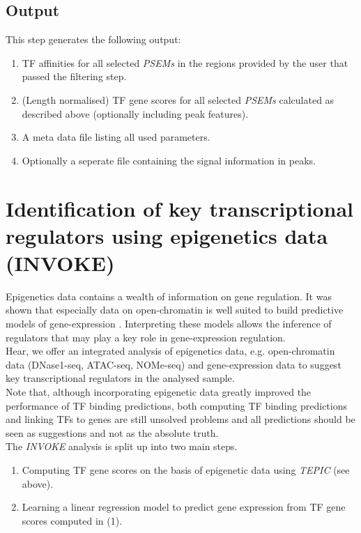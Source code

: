 \documentclass{article}
\begin{document}
\subsection*{Output}
This step generates the following output:
\begin{enumerate}
\item TF affinities for all selected \textit{PSEMs} in the regions provided by the user that passed the filtering step. 
\item (Length normalised) TF gene scores for all selected \textit{PSEMs} calculated as described above (optionally including peak features). 
\item A meta data file listing all used parameters.
\item Optionally a seperate file containing the signal information in peaks. 
\end{enumerate}

\section*{Identification of key transcriptional regulators using epigenetics data (INVOKE)}
Epigenetics data contains a wealth of information on gene regulation. It was shown that especially
data on open-chromatin is well suited to build predictive models of gene-expression \cite{pmid27899623,pmid22955983,pmid25231769,pmid22954627}.
Interpreting these models allows the inference of regulators that may play a key role in gene-expression regulation.
\bigskip
\\Hear, we offer an integrated analysis of epigenetics data, e.g. open-chromatin data (DNase1-seq, ATAC-seq, NOMe-seq) and gene-expression data
to suggest key transcriptional regulators in the analysed sample.
\bigskip
\\Note that, although incorporating epigenetic data greatly improved the performance of TF binding predictions, both computing TF binding predictions and linking TFs to genes are still unsolved problems and all predictions
should be seen as suggestions and not as the absolute truth.
\bigskip
\\The \textit{INVOKE} analysis is split up into two main steps. 
\begin{enumerate}
\item Computing TF gene scores on the basis of epigenetic data using \textit{TEPIC} (see above).
\item Learning a linear regression model to predict gene expression from TF gene scores computed in (1).
\end{enumerate}
\end{document}
